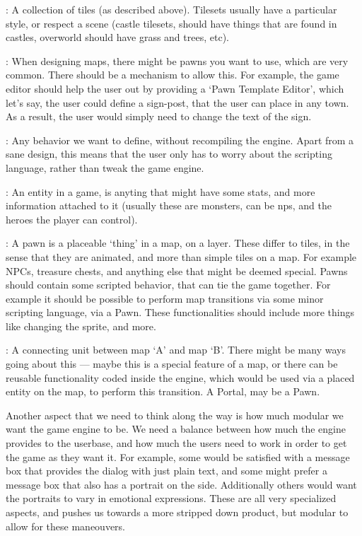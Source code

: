 \begin{description}
  : A collection of tiles (as described above). Tilesets usually
    have a particular style, or respect a scene (castle tilesets, should have
    things that are found in castles, overworld should have grass and trees, etc).


  : When designing maps, there might be pawns you want to
    use, which are very common. There should be a mechanism to allow this. For
    example, the game editor should help the user out by providing a `Pawn
    Template Editor', which let's say, the user could define a sign-post, that
    the user can place in any town. As a result, the user would simply need to
    change the text of the sign.

  : Any behavior we want to define, without recompiling the
    engine. Apart from a sane design, this means that the user only has to worry
    about the scripting language, rather than tweak the game engine.

  : An entity in a game, is anyting that might have some stats, and
    more information attached to it (usually these are monsters, can be nps, and
    the heroes the player can control).

  : A pawn is a placeable `thing' in a map, on a layer. These differ
    to tiles, in the sense that they are animated, and more than simple tiles on a
    map. For example NPCs, treasure chests, and anything else that might be deemed
    special. Pawns should contain some scripted behavior, that can tie the game
    together. For example it should be possible to perform map transitions via
    some minor scripting language, via a Pawn. These functionalities should
    include more things like changing the sprite, and more.

  : A connecting unit between map `A' and map `B'. There might be
    many ways going about this --- maybe this is a special feature of a map, or
    there can be reusable functionality coded inside the engine, which would be
    used via a placed entity on the map, to perform this transition. A Portal, may
    be a Pawn.

\end{description}

Another aspect that we need to think along the way is how much modular we want
the game engine to be. We need a balance between how much the engine provides
to the userbase, and how much the users need to work in order to get the game
as they want it. For example, some would be satisfied with a message box that
provides the dialog with just plain text, and some might prefer a message box
that also has a portrait on the side. Additionally others would want the
portraits to vary in emotional expressions. These are all very specialized
aspects, and pushes us towards a more stripped down product, but modular to
allow for these maneouvers.

